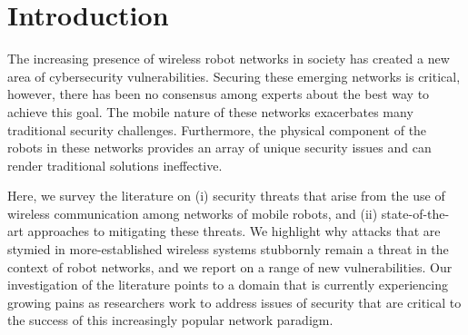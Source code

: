 



\section{Introduction}


The increasing presence of wireless robot networks in society has created a new area of cybersecurity vulnerabilities. Securing these emerging networks is critical, however, there has been no consensus among experts about the best way to achieve this goal. The mobile nature of these networks exacerbates many traditional security challenges. Furthermore, the physical component of the robots in these networks provides an array of unique security issues and can render traditional solutions ineffective.

Here, we survey the literature on (i) security threats that arise from the use of wireless communication among networks of mobile robots, and (ii) state-of-the-art approaches to mitigating these threats. We highlight why attacks that are stymied in more-established wireless systems stubbornly remain a threat in the context of robot networks, and we report on a range of new vulnerabilities.  Our investigation of the literature points to a domain that is currently experiencing growing pains as researchers work to address issues of security that are critical to the success of this increasingly popular network paradigm.







